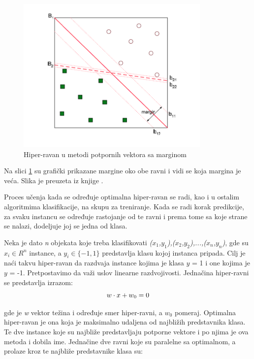 \documentclass[12pt,oneside]{memoir}
\begin{document}
\begin{figure}[h!]
\centering
\includegraphics[width=.7\textwidth]{images/svm1.png}
\caption{ Hiper-ravan u metodi potpornih vektora sa marginom }
\label{img:svm_2}
\end{figure}

\noindent
Na slici \ref{img:svm_2} su grafički prikazane margine oko obe ravni i vidi se koja margina je veća. Slika je preuzeta iz knjige \cite{introductiontodm}.

Proces učenja kada se određuje optimalna hiper-ravan se radi, kao i u ostalim algoritmima klasifikacije, na skupu za treniranje. Kada se radi korak predikcije, za svaku instancu se određuje rastojanje od te ravni i prema tome sa koje strane se nalazi, dodeljuje joj se jedna od klasa.

Neka je dato \textit{n} objekata koje treba klasifikovati \textit{\normalfont($x_1$,$y_1$\normalfont),\normalfont($x_2$,$y_2$\normalfont),...,\normalfont($x_n$,$y_n$\normalfont)}, gde su $x_i \in R^n$ instance, a $y_i \in \{-1,1\}$ predstavlja klasu kojoj instanca pripada. Cilj je naći takvu hiper-ravan da razdvaja instance kojima je klasa $y$ = 1 i one kojima je $y$ = -1. Pretpostavimo da važi uslov linearne razdvojivosti. 
\newpage
\noindent
Jednačina hiper-ravni se predstavlja izrazom:
\begin{equation}
	w\cdot x+w\textsubscript{0} = 0
\end{equation}

{\setlength{\parindent}{0cm}
gde je \textit{w} vektor težina i određuje smer hiper-ravni, a $w_0$ pomeraj. Optimalna hiper-ravan je ona koja je maksimalno udaljena od najbližih predstavnika klasa. Te dve instance koje su najbliže predstavljaju potporne vektore i po njima je ova metoda i dobila ime. Jednačine dve ravni koje su paralelne sa optimalnom, a prolaze kroz te najbliže predstavnike klasa su:
}
\end{document}
